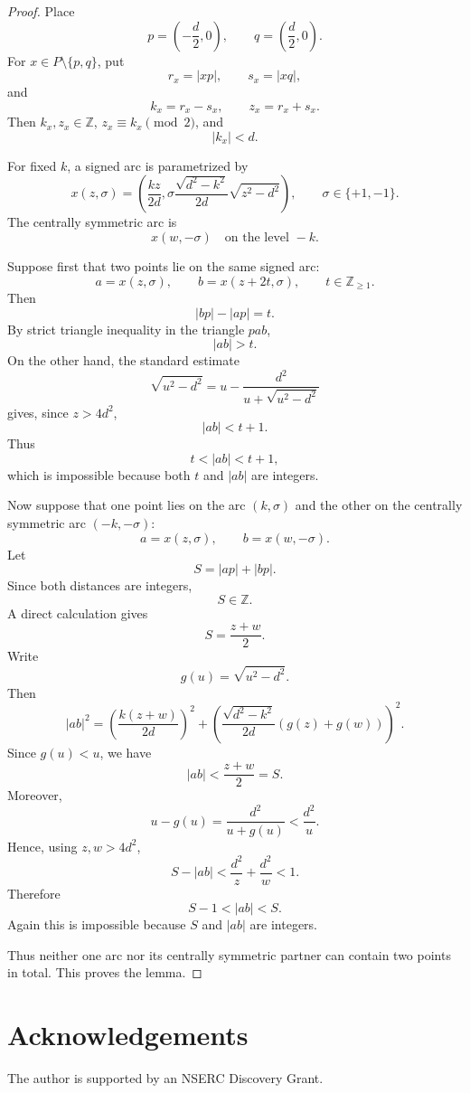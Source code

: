 \documentclass[11pt]{article}
\begin{document}
\begin{proof}
Place
\[
        p=\left(-\frac d2,0\right),
        \qquad
        q=\left(\frac d2,0\right).
\]
For \(x\in P\setminus\{p,q\}\), put
\[
        r_x=|xp|,\qquad s_x=|xq|,
\]
and
\[
        k_x=r_x-s_x,\qquad z_x=r_x+s_x.
\]
Then \(k_x,z_x\in\mathbb Z\), \(z_x\equiv k_x\pmod 2\), and
\[
        |k_x|<d.
\]

For fixed \(k\), a signed arc is parametrized by
\[
        x(z,\sigma)
        =
        \left(
        \frac{kz}{2d},
        \sigma\frac{\sqrt{d^2-k^2}}{2d}\sqrt{z^2-d^2}
        \right),
        \qquad \sigma\in\{+1,-1\}.
\]
The centrally symmetric arc is
\[
        x(w,-\sigma)
        \quad\text{on the level }-k.
\]

Suppose first that two points lie on the same signed arc:
\[
        a=x(z,\sigma),\qquad b=x(z+2t,\sigma),
        \qquad t\in\mathbb Z_{\ge1}.
\]
Then
\[
        |bp|-|ap|=t.
\]
By strict triangle inequality in the triangle \(pab\),
\[
        |ab|>t.
\]
On the other hand, the standard estimate
\[
        \sqrt{u^2-d^2}=u-\frac{d^2}{u+\sqrt{u^2-d^2}}
\]
gives, since \(z>4d^2\),
\[
        |ab|<t+1.
\]
Thus
\[
        t<|ab|<t+1,
\]
which is impossible because both \(t\) and \(|ab|\) are integers.

Now suppose that one point lies on the arc \((k,\sigma)\) and the other on
the centrally symmetric arc \((-k,-\sigma)\):
\[
        a=x(z,\sigma),\qquad b=x(w,-\sigma).
\]
Let
\[
        S=|ap|+|bp|.
\]
Since both distances are integers,
\[
        S\in\mathbb Z.
\]
A direct calculation gives
\[
        S=\frac{z+w}{2}.
\]
Write
\[
        g(u)=\sqrt{u^2-d^2}.
\]
Then
\[
        |ab|^2
        =
        \left(\frac{k(z+w)}{2d}\right)^2
        +
        \left(
        \frac{\sqrt{d^2-k^2}}{2d}(g(z)+g(w))
        \right)^2 .
\]
Since \(g(u)<u\), we have
\[
        |ab|<\frac{z+w}{2}=S.
\]
Moreover,
\[
        u-g(u)=\frac{d^2}{u+g(u)}<\frac{d^2}{u}.
\]
Hence, using \(z,w>4d^2\),
\[
        S-|ab|
        <
        \frac{d^2}{z}+\frac{d^2}{w}
        <
        1.
\]
Therefore
\[
        S-1<|ab|<S.
\]
Again this is impossible because \(S\) and \(|ab|\) are integers.

Thus neither one arc nor its centrally symmetric partner can contain two
points in total.  This proves the lemma.
\end{proof}

\section{Acknowledgements} The author is supported by an NSERC Discovery Grant.
\end{document}
